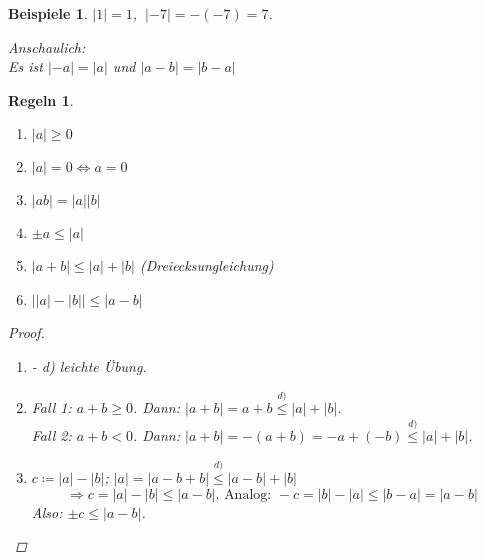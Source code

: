 \documentclass[titlepage,ngerman,a4paper,headsepline]{scrartcl}
\theoremstyle{named}
\theoremstyle{dotless}
\newtheorem*{beispiele}{Beispiele}
\newtheorem*{regeln}{Regeln}
\begin{document}
\begin{beispiele}
	$|1| = 1$, $~|-7| = -(-7) = 7$. 
	
	Anschaulich:   \\
	Es ist $|-a| = |a|$ und $|a - b| = |b - a|$
\end{beispiele}


\begin{regeln} ~\
	\begin{enumerate}
		\item $|a| \geq 0$
		\item $|a| = 0 \iff a = 0$
		\item $|ab| = |a||b|$
		\item $\pm a \leq |a|$
		\item $|a + b| \leq |a| + |b|$ (Dreiecksungleichung)
		\item $\left| |a| - |b| \right| \leq |a - b|$
	\end{enumerate}	

	\begin{proof} ~\
	  \begin{enumerate}
		\item[a)]- d) leichte Übung.
		\item[e)] Fall 1: $a +b \geq 0$. Dann: $|a + b| = a + b \overset{d)}{\leq} |a| + |b|$. \\
			Fall 2: $a + b < 0$. Dann: $|a + b| = - (a + b) = - a + (- b) \overset{d)}{\leq} |a| + |b|$.
		\item[f)] $c \coloneqq |a| - |b|$; $|a| = |a - b + b| \overset{d)}{\leq} |a - b | + |b|$
			$$
				\Rightarrow c = |a| - |b| \leq |a - b|. \text{ Analog: } -c = |b| - |a| \leq |b - a| = |a - b| 
			$$
			Also: $\pm c \leq |a - b|$.
	  \end{enumerate}
	\end{proof}
\end{regeln}
\end{document}

